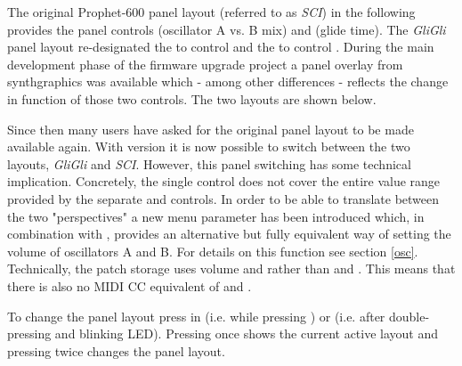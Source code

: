 The original Prophet-600 panel layout (referred to as \textit{SCI}) in the following provides the panel controls \mixer (oscillator A vs. B mix) and \glidepot (glide time). The \textit{GliGli} panel layout re-designated the \mixer to control \vola and the \glidepot to control \volb. During the main development phase of the firmware upgrade project a panel overlay from synthgraphics \cite{synthgraphics} was available which - among other differences - reflects the change in function of those two controls. The two layouts are shown below. 


Since then many users have asked for the original panel layout to be made available again. With version \version it is now possible to switch between the two layouts, \textit{GliGli} and \textit{SCI}. However, this panel switching has some technical implication. Concretely, the single \mixer control does not cover the entire value range provided by the separate \vola and \volb controls. In order to be able to translate between the two "perspectives" a new menu parameter \drive has been introduced which, in combination with \mixer, provides an alternative but fully equivalent way of setting the volume of oscillators A and B. For details on this function see section \ref{osc}. Technically, the patch storage uses volume \vola and \volb rather than \mixer and \drive. This means that there is also no MIDI CC equivalent of \mixer and \drive.

To change the panel layout press  in \shiftmode (i.e. while pressing \fromtape) or \shiftlock (i.e. after double-pressing \fromtape and blinking \fromtape LED). Pressing  once shows the current active layout and pressing  twice changes the panel layout. 


